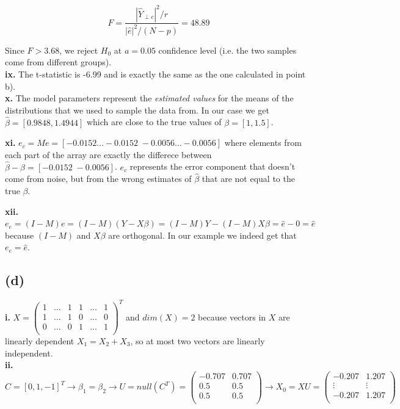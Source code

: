 \documentclass[12pt,a4paper,oneside]{report}
\begin{document}
$$F = \frac{|\hat{Y}_{\perp c}|^2 / r}{|\hat{e}|^2 / (N - p)} = 48.89$$

Since $F > 3.68$, we reject $H_0$ at $a = 0.05$ confidence level (i.e. the two samples come from different groups).\\

\textbf{ix.} The t-statistic is -6.99 and is exactly the same as the one calculated in point b). \\

\textbf{x. } The model parameters represent the \emph{estimated values} for the means of the distributions that we used to sample the data from. In our case we get $\hat{\beta} = [0.9848, 1.4944]$ which are close to the true values of $\beta = [1, 1.5]$.

\textbf{xi. } $e_c = M e = [-0.0152 \dots -0.0152 \; -0.0056 \dots -0.0056 ]$ where elements from each part of the array are exactly the differece between $\hat{\beta} - \beta = [-0.0152 \; -0.0056]$. $e_c$ represents the error component that doesn't come from noise, but from the wrong estimates of $\hat{\beta}$ that are not equal to the true $\beta$.

\textbf{xii. } $e_e = (I - M) e = (I - M) (Y - X\beta) = (I - M)Y - (I - M)X\beta = \hat{e} - 0 = \hat{e}$ because $(I-M)$ and $X\beta$ are orthogonal. In our example we indeed get that $e_e = \hat{e}$. %

\subsection*{(d)}

\textbf{i. } $X = \begin{pmatrix}
1 & \dots & 1 & 1 & \dots & 1\\
1 & \dots & 1 & 0 & \dots & 0\\
0 & \dots & 0 & 1 & \dots & 1\\
\end{pmatrix}^T$ and $dim(X) = 2$ because vectors in $X$ are linearly dependent $X_1 = X_2 + X_3$, so at most two vectors are linearly independent. \\

\textbf{ii. } $C = [0, 1, -1]^T \to \beta_1 = \beta_2 \to U = null(C^T) = \begin{pmatrix}
-0.707 & 0.707\\
0.5 & 0.5\\
0.5 & 0.5\\
\end{pmatrix} \to X_0 = X U = \begin{pmatrix}
-0.207 & 1.207\\
\vdots & \vdots\\
-0.207 & 1.207\\
\end{pmatrix}$
\end{document}
